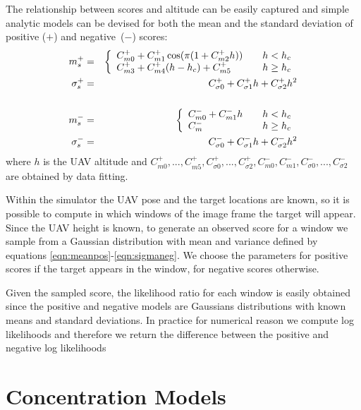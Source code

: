 \documentclass[a4paper,11pt]{report}
\begin{document}
The relationship between scores and altitude  can be easily captured and simple analytic models can be devised for both the mean and the standard deviation of positive ($+$) and negative~($-$) scores:
\begin{eqnarray}
m^{+}_s &=& 
\left\{ 
\begin{array}{l l}
C^{+}_{m 0} + C^{+}_{m 1} \cos (\pi (1 + C^{+}_{m 2} h))  & \quad h<h_c \\
C^{+}_{m 3} +  C^{+}_{m 4} (h - h_c) + C^{+}_{m 5} & \quad h \geq h_c \label{eqn:meanpos}
\end{array}
\right.
\\
\sigma^{+}_s &=& C^{+}_{\sigma 0} + C^{+}_{\sigma 1} h+ C^{+}_{\sigma 2} h^2
\\ \nonumber
\\ 
m^{-}_s &=&
\left\{ 
\begin{array}{l l}
C^{-}_{m 0} + C^{-}_{m 1} h & \quad h<h_c \\
C^{-}_{m} & \quad h \geq h_c
\end{array}
\right.
\\
\sigma^{-}_s &=& C^{-}_{\sigma 0} + C^{-}_{\sigma 1} h+ C^{-}_{\sigma 2} h^2 \label{eqn:sigmaneg}
\end{eqnarray}
where $h$ is the UAV altitude and $C^{+}_{m 0},...,C^{+}_{m 5},C^{+}_{\sigma 0},...,C^{+}_{\sigma 2},C^{-}_{m 0},C^{-}_{m 1},C^{-}_{\sigma 0},...,C^{-}_{\sigma 2}$ are obtained by data fitting.

Within the simulator the UAV pose and the target locations are known, so it is possible to compute in which windows of the image frame the target will appear. Since the UAV height is known, to generate an observed score for a window we sample from a Gaussian distribution with mean and variance defined by equations \ref{eqn:meanpos}-\ref{eqn:sigmaneg}. We choose the parameters for positive scores if the target appears in the window, for negative scores otherwise.

Given the sampled score, the likelihood ratio for each window is easily obtained since the positive and negative models are Gaussians distributions with known means and standard deviations.
In practice for numerical reason we compute log likelihoods and therefore we return the difference between the positive and negative log likelihoods

\newpage

\section{Concentration Models}
\end{document}
